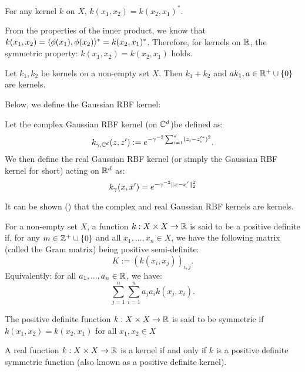 \documentclass[twoside]{memoir}
\begin{document}
	\begin{lem} \label{lem:kernelSymm}
		For any kernel $k$ on $X$, $k(x_1, x_2) = k(x_2, x_1)^*$.
	\end{lem}
	
	From the properties of the inner product, we know that $k(x_1, x_2) = \langle\phi(x_1), \phi(x_2)\rangle^* = k(x_2, x_1)^*$. Therefore, for kernels on $\mathbb{R}$, the symmetric property: $k(x_1, x_2) = k(x_2, x_1)$ holds.
	\begin{lem}
		Let $k_1, k_2$ be kernels on a non-empty set $X$. Then $k_1 + k_2$ and $ak_1, a \in \mathbb{R}^+ \cup \{0\}$ are kernels. 
	\end{lem}
	Below, we define the Gaussian RBF kernel:
	\begin{defn}
		Let the complex Gaussian RBF kernel (on $\mathbb{C}^d$)be defined as:
		\[ k_{\gamma, \mathbb{C}^d}(z, z') := e^{-\gamma^{-2} \sum_{i=1}^{d} (z_i - z_i'^*)^2 } .\]
		We then define the real Gaussian RBF kernel (or simply the Gaussian RBF kernel for short) acting on $\mathbb{R}^d$ as:
		\[ k_\gamma(x, x') = e^{- \gamma^{-2} \lVert x - x'\rVert_2^2} \]
	\end{defn}
	It can be shown (\cite{steinwartSVM}) that the complex and real Gaussian RBF kernels are kernels.
	\begin{defn}
		For a non-empty set $X$, a function $k: X \times X \rightarrow \mathbb{R}$ is said to be a positive definite if, for any $m \in \mathbb{Z}^+ \cup \{0\}$ and all $x_1, ..., x_n \in X$, we have the following matrix (called the Gram matrix) being positive semi-definite:
		\[ K := (k(x_i, x_j))_{i,j}. \]
		Equivalently: for all $a_1, ..., a_n \in \mathbb{R}$, we have:
		\[ \sum_{j=1}^{n} \sum_{i=1}^{n} a_j a_i k(x_j, x_i). \]
	\end{defn}
	\begin{defn}
		The positive definite function $k: X \times X \rightarrow \mathbb{R}$ is said to be symmetric if  $k(x_1, x_2) = k(x_2, x_1)$ for all $x_1, x_2 \in X$
	\end{defn}
	\begin{thm}
		A real function $k:X \times X \rightarrow \mathbb{R}$ is a kernel if and only if $k$ is a positive definite symmetric function (also known as a positive definite kernel).
	\end{thm}
\end{document}
